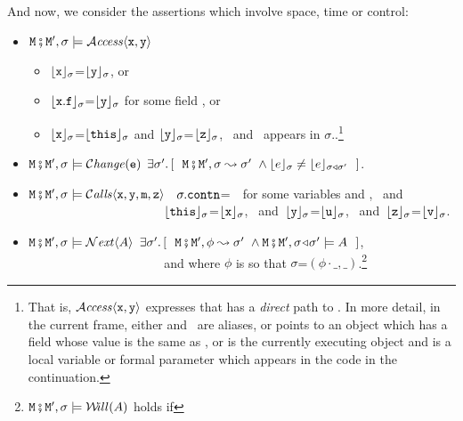 \begin{definition}
\begin{itemize}
\end{itemize}

And now, we consider the assertions which involve space, time or control:

\begin{itemize}
\item
$\M\mkpair \M', \sigma \models  \CanAccess{\prg{x}}{\prg{y}}$   \IFF  \begin{itemize}
\item
$\interp {\x} {\sigma}$=$\interp {\y} {\sigma}$, or
\item
$\interp {\x.\f} {\sigma}$=$\interp {\y} {\sigma}$  for some field ,  or
\item
$\interp {\x} {\sigma}$=$\interp {\this} {\sigma}$ and
  $\interp {\y} {\sigma}$=$\interp {\z} {\sigma}$,
\
and \z\ appears in  $\sigma$..\footnote{
That is, $\CanAccess{\prg{x}}{\prg{y}}$ expresses that \x has a {\em direct} path to \y.
In more detail, in the current frame,
either \x and \y\, are  aliases, or \x points to an object which has a field
whose value is the same as \y, or \x is the currently executing object and \y is
 a local variable or formal parameter which appears in the code in the continuation.
 }
 \end{itemize}
 \item
 $\M\mkpair \M', \sigma \models   \Changes{\prg{e}}$  \IFF
 $\exists \sigma'.\, [\ \ \M\mkpair \M',\sigma \leadsto \sigma' \ \wedge \interp{e}{\sigma} \neq \interp{e}{\sigma\triangleleft \sigma'} \ \  ]$.
   \item
$\M\mkpair \M', \sigma \models  \Calls{\prg{x},\prg{y},\prg{m},\prg{z}}$ \IFF \
 $\sigma.\prg{contn}$=\ \ for some variables  and ,  \ and \
\\ $\strut ~ \hspace{1.4in} $
$\interp{\prg{this}}{\sigma}$=$\interp{\prg{x}}{\sigma}$, \ and\ $\interp{\prg{y}}{\sigma}$=$\interp{\prg{u}}{\sigma}$,
 \ and\ $\interp{\prg{z}}{\sigma}$=$\interp{\prg{v}}{\sigma}$.
 \item
  $\M\mkpair \M', \sigma \models  \Next \A $
  \IFF
  $\exists \sigma'.\, [\ \ \M\mkpair \M',\phi \leadsto  \sigma' \ \wedge \M\mkpair \M',\sigma\adapt\sigma' \models \A \ \  ]$,
 \\
$\strut ~ \hspace{1.4in} $  and where $\phi$ is
so that $\sigma$=$(\phi\cdot\_,\_)$.\footnote{$\M\mkpair \M', \sigma \models  \Future \A $ holds if
}
\end{itemize}
\end{definition}
